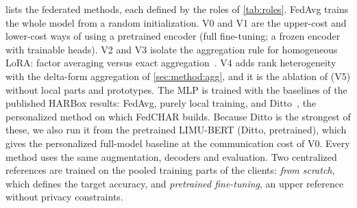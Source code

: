  lists the federated methods, each defined by the roles of \cref{tab:roles}.
FedAvg trains the whole model from a random initialization. V0 and V1 are the upper-cost and
lower-cost ways of using a pretrained encoder (full fine-tuning; a frozen encoder with trainable
heads). V2 and V3 isolate the aggregation rule for homogeneous LoRA: factor averaging versus
exact aggregation~\cite{singhal2025fedex}. V4 adds rank heterogeneity with the delta-form
aggregation of \cref{sec:method:agg}, and it is the ablation of \method{} (V5) without local parts and
prototypes. The MLP is trained with the baselines of the published HARBox results: FedAvg, purely
local training, and Ditto~\cite{li2021ditto}, the personalized method on which FedCHAR
builds. Because Ditto is the strongest of these, we also run it from the pretrained LIMU-BERT
(Ditto, pretrained), which gives the personalized full-model baseline at the communication cost of
V0. Every method uses the same augmentation, decoders and evaluation. Two centralized
references are trained on the pooled training parts of the clients: \emph{from scratch}, which
defines the target accuracy, and \emph{pretrained fine-tuning}, an upper reference without privacy
constraints.

